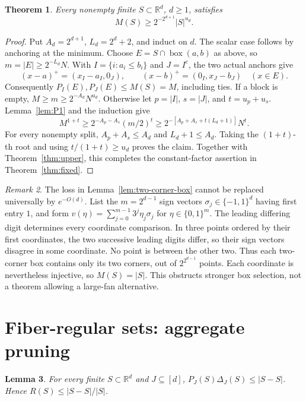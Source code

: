 \documentclass[11pt]{amsart}
\newtheorem{theorem}{Theorem}[section]
\newtheorem{lemma}[theorem]{Lemma}
\theoremstyle{definition}
\theoremstyle{remark}
\newtheorem{remark}[theorem]{Remark}
\newcommand{\R}{\mathbb{R}}
\newcommand{\Mf}{M}
\begin{document}
\begin{theorem}\label{thm:two-corner-fan}
Every nonempty finite $S\subset\R^d$, $d\ge1$, satisfies
\[
\Mf(S)\ge2^{-2^{d+1}}|S|^{u_d}.
\]
\end{theorem}
\begin{proof}
Put $A_d=2^{d+1}$, $L_d=2^d+2$, and induct on $d$. The scalar case follows by anchoring at the minimum. Choose $E=S\cap\operatorname{box}(a,b)$ as above, so $m=|E|\ge2^{-L_d}N$. With $I=\{i:a_i\le b_i\}$ and $J=I^c$, the two actual anchors give
\[
(x-a)^+=(x_I-a_I,0_J),\qquad
(x-b)^+=(0_I,x_J-b_J)\quad(x\in E).
\]
Consequently $P_I(E),P_J(E)\le\Mf(S)=M$, including ties. If a block is empty, $M\ge m\ge2^{-A_d}N^{u_d}$. Otherwise let $p=|I|$, $s=|J|$, and $t=u_p+u_s$. Lemma~\ref{lem:P1} and the induction give
\[
M^{1+t}\ge2^{-A_p-A_s}(m/2)^t
\ge2^{-[A_p+A_s+t(L_d+1)]}N^t.
\]
For every nonempty split, $A_p+A_s\le A_d$ and $L_d+1\le A_d$. Taking the $(1+t)$-th root and using $t/(1+t)\ge u_d$ proves the claim. Together with Theorem~\ref{thm:upper}, this completes the constant-factor assertion in Theorem~\ref{thm:fixed}.
\end{proof}

\begin{remark}
The loss in Lemma~\ref{lem:two-corner-box} cannot be replaced universally by $e^{-O(d)}$. List the $m=2^{d-1}$ sign vectors $\sigma_j\in\{-1,1\}^d$ having first entry $1$, and form $v(\eta)=\sum_{j=0}^{m-1}3^j\eta_j\sigma_j$ for $\eta\in\{0,1\}^m$. The leading differing digit determines every coordinate comparison. In three points ordered by their first coordinates, the two successive leading digits differ, so their sign vectors disagree in some coordinate. No point is between the other two. Thus each two-corner box contains only its two corners, out of $2^{2^{d-1}}$ points. Each coordinate is nevertheless injective, so $M(S)=|S|$. This obstructs stronger box selection, not a theorem allowing a large-fan alternative.
\end{remark}

\section{Fiber-regular sets: aggregate pruning}\label{sec:regular}

\begin{lemma}\label{lem:PDelta}
For every finite $S\subset\R^d$ and $J\subseteq[d]$, $P_J(S)\Delta_J(S)\le|S-S|$. Hence $R(S)\le|S-S|/|S|$.
\end{lemma}
\end{document}
